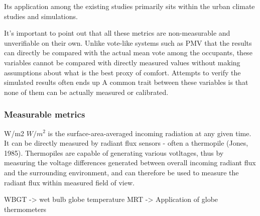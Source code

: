     Its application among the existing studies primarily sits within the urban climate studies and simulations.
    
    It's important to point out that all these metrics are non-measurable and unverifiable on their own. Unlike vote-like systems such as PMV that the results can directly be compared with the actual mean vote among the occupants, these variables cannot be compared with directly measured values without making assumptions about what is the best proxy of comfort. 
    Attempts to verify the simulated results often ends up  
    A common trait between these variables is that none of them can be actually measured or calibrated. 
\subsubsection{Measurable metrics}
        W/m2
        $W/m^2$ is the surface-area-averaged incoming radiation at any given time. It can be directly measured by radiant flux sensors - often a thermopile (Jones, 1985). Thermopiles are capable of generating various votltages, thus by measuring the voltage differences generated between overall incoming radiant flux and the surrounding environment, and can therefore be used to measure the radiant flux within measured field of view. 
        
        WBGT -> wet bulb globe temperature
        MRT -> Application of globe thermometers




